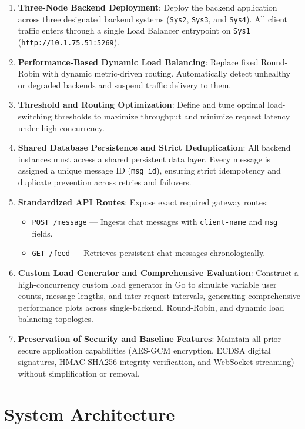 \documentclass[12pt,a4paper]{article}
\begin{document}
\begin{enumerate}[label=\textbf{\arabic*.}]
    \item \textbf{Three-Node Backend Deployment}: Deploy the backend application across three designated backend systems (\texttt{Sys2}, \texttt{Sys3}, and \texttt{Sys4}). All client traffic enters through a single Load Balancer entrypoint on \texttt{Sys1} (\texttt{http://10.1.75.51:5269}).
    \item \textbf{Performance-Based Dynamic Load Balancing}: Replace fixed Round-Robin with dynamic metric-driven routing. Automatically detect unhealthy or degraded backends and suspend traffic delivery to them.
    \item \textbf{Threshold and Routing Optimization}: Define and tune optimal load-switching thresholds to maximize throughput and minimize request latency under high concurrency.
    \item \textbf{Shared Database Persistence and Strict Deduplication}: All backend instances must access a shared persistent data layer. Every message is assigned a unique message ID (\texttt{msg\_id}), ensuring strict idempotency and duplicate prevention across retries and failovers.
    \item \textbf{Standardized API Routes}: Expose exact required gateway routes:
    \begin{itemize}
        \item \texttt{POST /message} --- Ingests chat messages with \texttt{client-name} and \texttt{msg} fields.
        \item \texttt{GET /feed} --- Retrieves persistent chat messages chronologically.
    \end{itemize}
    \item \textbf{Custom Load Generator and Comprehensive Evaluation}: Construct a high-concurrency custom load generator in Go to simulate variable user counts, message lengths, and inter-request intervals, generating comprehensive performance plots across single-backend, Round-Robin, and dynamic load balancing topologies.
    \item \textbf{Preservation of Security and Baseline Features}: Maintain all prior secure application capabilities (AES-GCM encryption, ECDSA digital signatures, HMAC-SHA256 integrity verification, and WebSocket streaming) without simplification or removal.
\end{enumerate}

\section{System Architecture}
\end{document}
